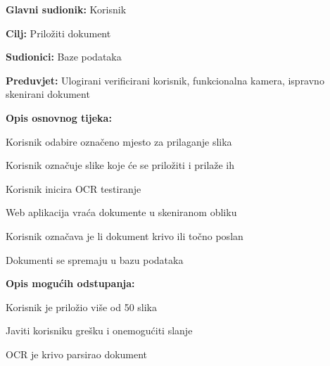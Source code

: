 					\noindent {}
					\begin{packed_item}
	
						\item \textbf{Glavni sudionik:} Korisnik
						\item  \textbf{Cilj:} Priložiti dokument
						\item  \textbf{Sudionici:} Baze podataka
						\item  \textbf{Preduvjet:} Ulogirani verificirani korisnik, funkcionalna kamera, ispravno skenirani dokument
						\item  \textbf{Opis osnovnog tijeka:}
						
						\item[] \begin{packed_enum}
	
							\item Korisnik odabire  označeno mjesto za prilaganje slika
							\item Korisnik označuje slike koje će se priložiti i prilaže ih
							\item Korisnik inicira OCR testiranje
							\item Web aplikacija vraća dokumente u skeniranom obliku
							\item Korisnik označava je li dokument krivo ili točno poslan
							\item Dokumenti se spremaju u bazu podataka 						\end{packed_enum}
						
						\item  \textbf{Opis mogućih odstupanja:}
						
						\item[] \begin{packed_item}
	
							\item[2.a] Korisnik je priložio više od 50 slika
							\item[] \begin{packed_enum}
								
								\item Javiti korisniku grešku i onemogućiti slanje
								\item OCR je krivo parsirao dokument
							\end{packed_enum}
							
						\end{packed_item}
					\end{packed_item}
					
